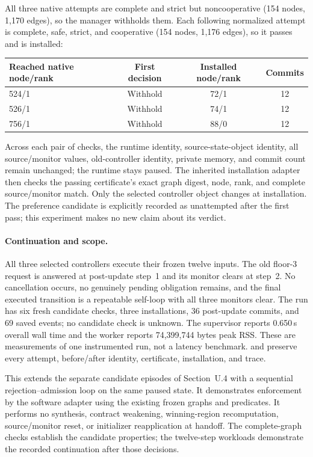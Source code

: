 All three native attempts are complete and strict but noncooperative
(154 nodes, 1,170 edges), so the manager withholds them. Each following
normalized attempt is complete, safe, strict, and cooperative
(154 nodes, 1,176 edges), so it passes and is installed:
\begin{center}
\begin{tabular}{lccc}
\toprule
Reached native node/rank & First decision & Installed node/rank & Commits\\
\midrule
524/1 & Withhold & 72/1 & 12\\
526/1 & Withhold & 74/1 & 12\\
756/1 & Withhold & 88/0 & 12\\
\bottomrule
\end{tabular}
\end{center}
Across each pair of checks, the runtime identity, source-state-object
identity, all source/monitor values, old-controller identity, private
memory, and commit count remain unchanged; the runtime stays paused.
The inherited installation adapter then checks the passing certificate's
exact graph digest, node, rank, and complete source/monitor match.
Only the selected controller object changes at installation.
The preference candidate is explicitly recorded as unattempted after
the first pass; this experiment makes no new claim about its verdict.

\paragraph{Continuation and scope.}
All three selected controllers execute their frozen twelve inputs.
The old floor-3 request is answered at post-update step~1 and its monitor
clears at step~2. No cancellation occurs, no genuinely pending obligation
remains, and the final executed transition is a repeatable self-loop
with all three monitors clear. The run has six fresh candidate checks,
three installations, 36 post-update commits, and 69 saved events; no
candidate check is unknown. The supervisor reports 0.650\,s overall
wall time and the worker reports 74,399,744 bytes peak RSS.
These are measurements of one instrumented run, not a latency benchmark.
 and  preserve every
attempt, before/after identity, certificate, installation, and trace.

This extends the separate candidate episodes of Section~U.4 with a
sequential rejection--admission loop on the same paused state.
It demonstrates enforcement by the software adapter using the existing
frozen graphs and predicates. It performs no synthesis, contract
weakening, winning-region recomputation, source/monitor reset, or
initializer reapplication at handoff. The complete-graph checks establish
the candidate properties; the twelve-step workloads demonstrate the
recorded continuation after those decisions.

